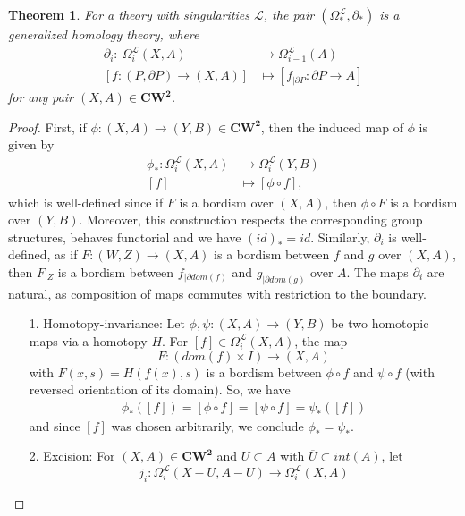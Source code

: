 \documentclass[11pt]{book}
\newtheorem{theorem}{Theorem}
\begin{document}
\begin{theorem}
For a theory with singularities $\mathcal{L}$, the pair $(\Omega_*^{\mathcal{L}}, \partial_*)$ is a generalized homology theory, where 
\begin{align*}
\partial_i :\  \Omega_i^{\mathcal{L}}(X,A) &\to \Omega_{i-1}^{\mathcal{L}}(A) \\
[f: (P, \partial P) \to (X,A)] &\mapsto [f_{| \partial P}: \partial P \to A]
\end{align*}
for any pair $(X,A) \in \boldsymbol{CW^2}$.
\end{theorem}

\begin{proof}
First, if $\phi : (X,A) \to (Y,B) \in \boldsymbol{CW^2}$, then the induced map of $\phi $ is given by
\begin{align*}
\phi_* : \Omega_i^{\mathcal{L}}(X,A) &\to \Omega_i^{\mathcal{L}}(Y,B) \\
[f] &\mapsto [\phi \circ f],
\end{align*}
which is well-defined since if $F$ is a bordism over $(X,A)$, then $\phi \circ F$ is a bordism over $(Y,B)$. Moreover, this construction respects the corresponding group structures, behaves functorial and we have $(id)_*=id$. Similarly, $\partial_i$ is well-defined, as if $F:(W,Z) \to (X,A)$ is a bordism between $f$ and $g$ over $(X,A)$, then $F_{|Z}$ is a bordism between $f_{| \partial dom(f)}$ and $g_{| \partial dom(g)}$ over $A$. The maps $\partial_i$ are natural, as composition of maps commutes with restriction to the boundary. 
\begin{itemize}
\item[1.] Homotopy-invariance: Let $\phi, \psi : (X,A) \to (Y,B)$ be two homotopic maps via a homotopy $H$. For $[f] \in \Omega_i^{\mathcal{L}}(X,A)$, the map
\begin{equation*}
F: (dom(f) \times I) \to (X,A) 
\end{equation*}
with $F(x,s)=H(f(x),s)$ is a bordism between $\phi \circ f$ and $\psi \circ f$ (with reversed orientation of its domain). So, we have
\begin{align*}
\phi_* ([f]) = [\phi \circ f] = [\psi \circ f] = \psi_* ([f])
\end{align*}
and since $[f]$ was chosen arbitrarily, we conclude $\phi_*= \psi_*$.
\item[2.] Excision: For $(X,A) \in \boldsymbol{CW^2}$ and $U \subset A$ with $\overline{U} \subset int(A)$, let 
\begin{equation*}
j_i: \Omega_i^{\mathcal{L}}(X-U, A-U) \to \Omega_i^{\mathcal{L}}(X,A)

\end{equation*}
\end{itemize}
\end{proof}
\end{document}

